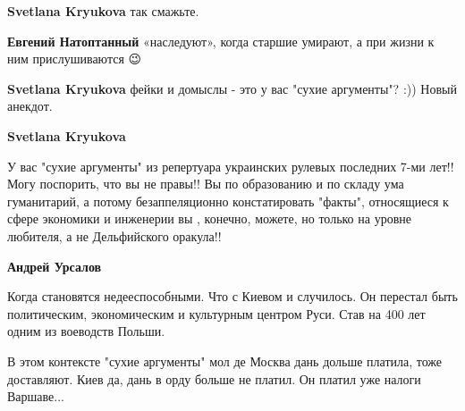 \begin{itemize}
\begin{itemize}
\textbf{Svetlana Kryukova} так смажьте.

 
\textbf{Евгений Натоптанный} «наследуют», когда старшие умирают, а при жизни к ним прислушиваются 😉

 
\textbf{Svetlana Kryukova} фейки и домыслы - это у вас "сухие аргументы"? :)) Новый анекдот.

 
\textbf{Svetlana Kryukova} 

У вас "сухие аргументы" из репертуара украинских рулевых последних 7-ми лет!!
Могу поспорить, что вы не правы!! Вы по образованию и по складу ума
гуманитарий, а потому безаппеляционно констатировать "факты", относящиеся к
сфере экономики и инженерии вы , конечно, можете, но только на уровне любителя,
а не Дельфийского оракула!!


 
\textbf{Андрей Урсалов} 

Когда становятся недееспособными. Что с Киевом и случилось. Он перестал быть
политическим, экономическим и культурным центром Руси. Став на 400 лет одним из
воеводств Польши.

В этом контексте "сухие аргументы" мол де Москва дань дольше платила, тоже
доставляют. Киев да, дань в орду больше не платил. Он платил уже налоги
Варшаве...

 

\end{itemize}
\end{itemize}

